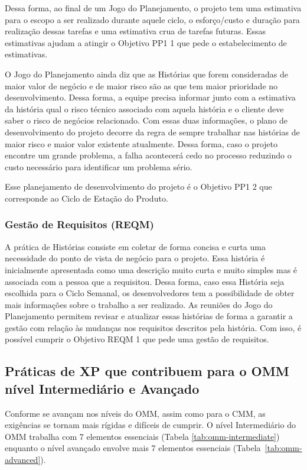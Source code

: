Dessa forma, ao final de um Jogo do Planejamento, o projeto tem uma
estimativa para o escopo a ser realizado durante aquele ciclo, o
esforço/custo e duração para realização dessas tarefas e uma
estimativa crua de tarefas futuras. Essas estimativas ajudam a atingir
o Objetivo PP1 1 que pede o estabelecimento de estimativas.

O Jogo do Planejamento ainda diz que as Histórias que forem
consideradas de maior valor de negócio e de maior risco são as que tem
maior prioridade no desenvolvimento. Dessa forma, a equipe precisa
informar junto com a estimativa da história qual o risco técnico
associado com aquela história e o cliente deve saber o risco de
negócios relacionado. Com essas duas informações, o plano de
desenvolvimento do projeto decorre da regra de sempre trabalhar nas
histórias de maior risco e maior valor existente atualmente. Dessa
forma, caso o projeto encontre um grande problema, a falha acontecerá
cedo no processo reduzindo o custo necessário para identificar um
problema sério.

Esse planejamento de desenvolvimento do projeto é o Objetivo PP1 2 que
corresponde ao Ciclo de Estação do Produto.

\subsubsection{Gestão de Requisitos (REQM)}
\label{sec:+reqm}

A prática de Histórias consiste em coletar de forma concisa e curta
uma necessidade do ponto de vista de negócio para o projeto. Essa
história é inicialmente apresentada como uma descrição muito curta e
muito simples mas é associada com a pessoa que a requisitou. Dessa
forma, caso essa História seja escolhida para o Ciclo Semanal, os
desenvolvedores tem a possibilidade de obter mais informações sobre o
trabalho a ser realizado. As reuniões do Jogo do Planejamento permitem
revisar e atualizar essas histórias de forma a garantir a gestão com
relação às mudanças nos requisitos descritos pela história. Com isso,
é possível cumprir o Objetivo REQM 1 que pede uma gestão de
requisitos.

\subsection{Práticas de XP que contribuem para o OMM nível
  Intermediário e Avançado}
\label{sec:xp-omm-intermediate}

Conforme se avançam nos níveis do OMM, assim como para o CMM, as
exigências se tornam mais rígidas e difíceis de cumprir. O nível
Intermediário do OMM trabalha com 7 elementos essenciais (Tabela
\ref{tab:omm-intermediate}) enquanto o nível avançado envolve mais 7
elementos essenciais (Tabela~\ref{tab:omm-advanced}).


